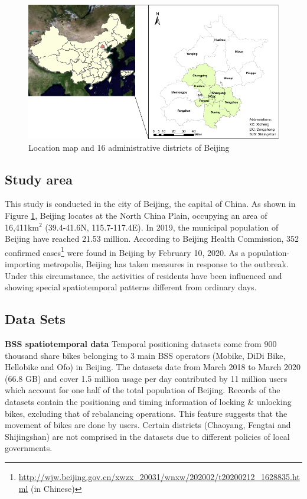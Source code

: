 \documentclass[preprints,ijgi,submit,moreauthors]{Definitions/mdpi}
\begin{document}
\begin{figure}[H]
    \centering
    \includegraphics[width=\textwidth]{Figures/StudyArea.pdf}
    \caption{Location map and 16 administrative districts of Beijing}
    \label{fig:study_area}
\end{figure}

\subsection{Study area}
This study is conducted in the city of Beijing, the capital of China. 
As shown in Figure \ref{fig:study_area}, Beijing locates at the North China Plain, occupying an area of 16,411km$^2$ (39.4{\degree}-41.6{\degree}N, 115.7{\degree}-117.4{\degree}E). 
In 2019, the municipal population of Beijing have reached 21.53 million. According to Beijing Health Commission, 352 confirmed cases\footnote{\url{http://wjw.beijing.gov.cn/xwzx_20031/wnxw/202002/t20200212_1628835.html} (in Chinese)} were found in Beijing by February 10, 2020. 
As a population-importing metropolis, Beijing has taken measures in response to the outbreak. 
Under this circumstance, the activities of residents have been influenced and showing special spatiotemporal patterns different from ordinary days.

\subsection{Data Sets}
\textbf{BSS spatiotemporal data} Temporal positioning datasets come from 900 thousand share bikes belonging to 3 main BSS operators (Mobike, DiDi Bike, Hellobike and Ofo) in Beijing.
The datasets date from March 2018 to March 2020 (66.8 GB) and cover 1.5 million usage per day contributed by 11 million users which account for one half of the total population of Beijing.
Records of the datasets contain the positioning and timing information of locking \& unlocking bikes, excluding that of rebalancing operations.
This feature suggests that the movement of bikes are done by users.
Certain districts (Chaoyang, Fengtai and Shijingshan) are not comprised in the datasets due to different policies of local governments.
\end{document}
